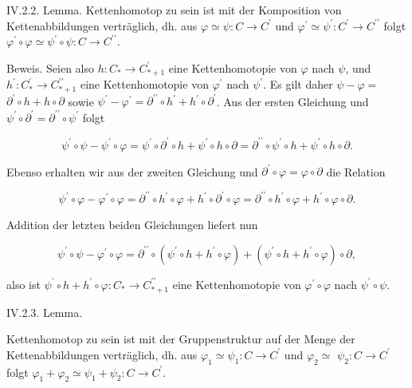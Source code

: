\documentclass[10pt, letterpaper]{article}
\begin{document}
IV.2.2. Lemma. Kettenhomotop zu sein ist mit der Komposition von Kettenabbildungen verträglich, dh. aus $\varphi \simeq \psi: C \rightarrow C^{\prime}$ und $\varphi^{\prime} \simeq \psi^{\prime}: C^{\prime} \rightarrow C^{\prime \prime}$ folgt $\varphi^{\prime} \circ \varphi \simeq \psi^{\prime} \circ \psi: C \rightarrow C^{\prime \prime}$.

Beweis. Seien also $h: C_* \rightarrow C_{*+1}^{\prime}$ eine Kettenhomotopie von $\varphi$ nach $\psi$, und $h^{\prime}: C_*^{\prime} \rightarrow C_{*+1}^{\prime \prime}$ eine Kettenhomotopie von $\varphi^{\prime}$ nach $\psi^{\prime}$. Es gilt daher $\psi-\varphi=$ $\partial^{\prime} \circ h+h \circ \partial$ sowie $\psi^{\prime}-\varphi^{\prime}=\partial^{\prime \prime} \circ h^{\prime}+h^{\prime} \circ \partial^{\prime}$. Aus der ersten Gleichung und $\psi^{\prime} \circ \partial^{\prime}=\partial^{\prime \prime} \circ \psi^{\prime}$ folgt

$$
\psi^{\prime} \circ \psi-\psi^{\prime} \circ \varphi=\psi^{\prime} \circ \partial^{\prime} \circ h+\psi^{\prime} \circ h \circ \partial=\partial^{\prime \prime} \circ \psi^{\prime} \circ h+\psi^{\prime} \circ h \circ \partial .
$$


Ebenso erhalten wir aus der zweiten Gleichung und $\partial^{\prime} \circ \varphi=\varphi \circ \partial$ die Relation

$$
\psi^{\prime} \circ \varphi-\varphi^{\prime} \circ \varphi=\partial^{\prime \prime} \circ h^{\prime} \circ \varphi+h^{\prime} \circ \partial^{\prime} \circ \varphi=\partial^{\prime \prime} \circ h^{\prime} \circ \varphi+h^{\prime} \circ \varphi \circ \partial .
$$


Addition der letzten beiden Gleichungen liefert nun

$$
\psi^{\prime} \circ \psi-\varphi^{\prime} \circ \varphi=\partial^{\prime \prime} \circ\left(\psi^{\prime} \circ h+h^{\prime} \circ \varphi\right)+\left(\psi^{\prime} \circ h+h^{\prime} \circ \varphi\right) \circ \partial,
$$

also ist $\psi^{\prime} \circ h+h^{\prime} \circ \varphi: C_* \rightarrow C_{*+1}^{\prime \prime}$ eine Kettenhomotopie von $\varphi^{\prime} \circ \varphi$ nach $\psi^{\prime} \circ \psi$.


IV.2.3. Lemma. 


Kettenhomotop zu sein ist mit der Gruppenstruktur auf der Menge der Kettenabbildungen verträglich, dh. aus $\varphi_1 \simeq \psi_1: C \rightarrow C^{\prime}$ und $\varphi_2 \simeq$ $\psi_2: C \rightarrow C^{\prime}$ folgt $\varphi_1+\varphi_2 \simeq \psi_1+\psi_2: C \rightarrow C^{\prime}$.
\end{document}
